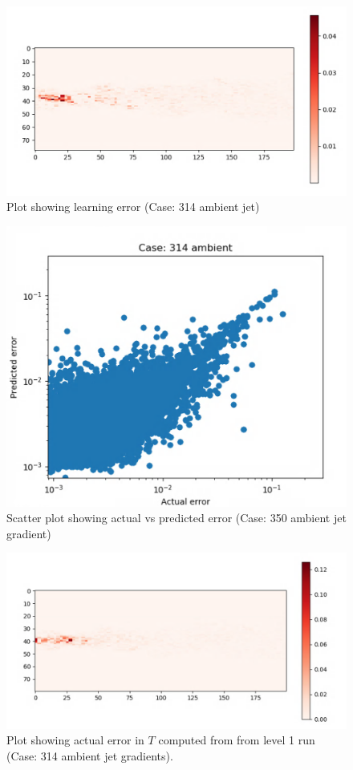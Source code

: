 \documentclass{article}
\begin{document}
\begin{figure}[h!]
    \centering
    \includegraphics[width = 0.9\linewidth]{figures/314_01_error.png}
    \caption{Plot showing learning error (Case: 314 ambient jet)}
    \label{amr_err}
\end{figure}

\begin{figure}[h!]
    \centering
    \includegraphics[width = 0.6\linewidth]{figures/314_01_grad_error_scatter.png}
    \caption{Scatter plot showing actual vs predicted error (Case: 350 ambient jet gradient)}
    \label{amr_err}
\end{figure}

\begin{figure}[h!]
    \centering
    \includegraphics[width = 0.85\linewidth]{figures/314_01_grad_actual.png}
    \caption{Plot showing actual error in $T$ computed from from level 1 run (Case: 314 ambient jet gradients).}
    \label{amr_err}
\end{figure}
\end{document}
